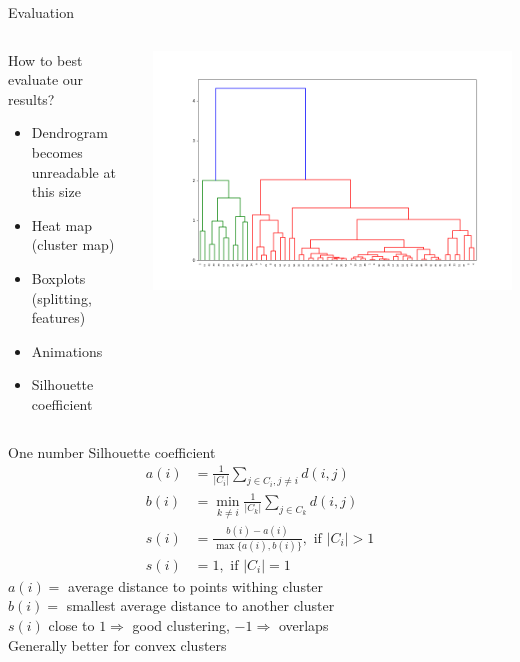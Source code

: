 \documentclass[shortpres]{beamer}
\begin{document}
\begin{frame}{Evaluation}
    \begin{columns}
    \begin{column}{0.6\textwidth}
    How to best evaluate our results?
    \begin{itemize}
        \item Dendrogram becomes unreadable at this size
        \item Heat map (cluster map)
        \item Boxplots (splitting, features)
        \item Animations
        \item Silhouette coefficient
    \end{itemize}
    \end{column}
    \begin{column}{0.4\textwidth}
        \centering
        \includegraphics[width=\textwidth]{dendro.png}
    \end{column}
    \end{columns}
    
\end{frame}

\begin{frame}{One number}
Silhouette coefficient
    \begin{equation}
        \begin{split}
            a(i) & = \frac{1}{\lvert C_i \rvert} \sum_{j \in C_i, j \neq i} d(i, j) \\
            b(i) & = \min_{k \neq i}\frac{1}{\lvert C_k \rvert}\sum_{j \in C_k}d(i,j)\\
            s(i) & = \frac{b(i) - a(i)}{\max\{a(i), b(i)\}}, \textrm{ if } \lvert C_i \rvert > 1\\
            s(i) & = 1, \textrm{ if } \lvert C_i \rvert = 1
        \end{split}
    \end{equation}
$a(i)=$ average distance to points withing cluster \\
$b(i)=$ smallest average distance to another cluster \\
$s(i)$ close to $1 \Rightarrow$ good clustering, $-1 \Rightarrow$ overlaps \\
Generally better for convex clusters
\end{frame}
\end{document}
